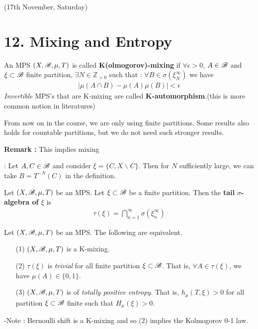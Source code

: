 \documentclass[12pt,a4paper]{report}
\newenvironment{proof}
{\begin{changemargin}{1cm}{0.5cm} 
	}%
	{\end{changemargin}
}
\begin{document}
\newday

(17th November, Saturday)

\section*{12. Mixing and Entropy}

 An MPS $(X,\mathscr{B}, \mu, T)$ is called \textbf{K(olmogorov)-mixing} if $\forall \epsilon >0$, $A\in \mathscr{B}$ and $\xi\subset \mathscr{B}$ finite partition, $\exists N \in \mathbb{Z}_{>0}$ such that : $\forall B \in \sigma( \xi^{\infty}_N)$ we have
\begin{align*}
|\mu(A \cap B) - \mu(A) \mu(B)| < \epsilon
\end{align*}
\emph{Invertible} MPS's that are K-mixing are called \textbf{K-automorphism}.(this is more common notion in literatures)
\s

From now on in the course, we are only using finite partitions. Some results also holds for countable partitions, but we do not need such stronger results.
\s

\textbf{Remark :} This implies mixing
\begin{proof}
: Let $A, C \in \mathscr{B}$ and consider $\xi = \{C, X \backslash C \}$. Then for $N$ sufficiently large, we can take $B = T^{-N}(C)$ in the definition. 
\end{proof}

 Let $(X,\mathscr{B}, \mu, T)$ be an MPS. Let $\xi \subset \mathscr{B}$ be a finite partition. Then the \textbf{tail $\sigma$-algebra of $\xi$} is
\begin{align*}
\tau (\xi) = \bigcap_{n=1}^{\infty} \sigma(\xi_n^{\infty})
\end{align*}
\s

\thm Let $(X,\mathscr{B}, \mu, T)$ be an MPS. The following are equivalent.
\begin{itemize}
\item[(1)] $(X,\mathscr{B}, \mu, T)$ is a K-mixing.
\item[(2)] $\tau(\xi)$ is \emph{trivial} for all finite partition $\xi \subset \mathscr{B}$. That is, $\forall A \in \tau(\xi)$, we have $\mu(A) \in \{0,1\}$.
\item[(3)] $(X,\mathscr{B}, \mu, T)$ is of \emph{totally positive entropy}. That is, $h_{\mu}(T,\xi) >0$ for all partition $\xi \subset \mathscr{B}$ finite such that $H_{\mu}(\xi) >0$.
\end{itemize}
\s

-Note : Bernoulli shift is a K-mixing and so (2) implies the Kolmogorov 0-1 law.
\s
\end{document}
